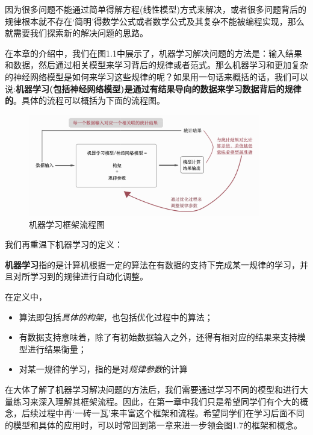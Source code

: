 \documentclass[12pt]{article}
\numberwithin{figure}{section}
\newenvironment{fullmodel}{
			\smallskip\noindent
			\begin{minipage}{\textwidth+\marginparwidth+\marginparsep}\smallskip\smallskip}
			{\smallskip\smallskip\end{minipage}\vspace{.1in}
			}
\numberwithin{equation}{section}
\begin{document}
因为很多问题不能通过简单得解方程(线性模型)方式来解决，或者很多问题背后的规律根本就不存在`简明'得数学公式或者数学公式及其复杂不能被编程实现，那么就需要我们探索新的解决问题的思路。

在本章的介绍中，我们在图1.1中展示了，机器学习解决问题的方法是：输入结果和数据，然后通过相关模型来学习背后的规律或者范式。那么机器学习和更加复杂的神经网络模型是如何来学习这些规律的呢？如果用一句话来概括的话，我们可以说:\textbf{机器学习(包括神经网络模型)是通过有结果导向的数据来学习数据背后的规律的}。具体的流程可以概括为下面的流程图。
\begin{figure}[H]
	\centering
	\includegraphics[width=0.9\textwidth]{fig/C1C2MLMechanism}
	\caption{机器学习框架流程图}
\end{figure}

我们再重温下机器学习的定义：
\begin{remark}
\textbf{机器学习}指的是计算机根据一定的算法在有数据的支持下完成某一规律的学习，并且对所学习到的规律进行自动化调整。	
\end{remark}

在定义中，
\begin{itemize}
	\item 算法即包括\textit{具体的构架}，也包括优化过程中的算法；
	\item 有数据支持意味着，除了有初始数据输入之外，还得有相对应的结果来支持模型进行结果衡量；
	\item 对某一规律的学习，指的是对\textit{规律参数}的计算
\end{itemize}

\begin{fullmodel}
	\begin{tcolorbox}[title=冰冻三尺非一日之寒]
		在大体了解了机器学习解决问题的方法后，我们需要通过学习不同的模型和进行大量练习来深入理解其框架流程。因此，在第一章中我们只是希望同学们有个大的概念，后续过程中再`一砖一瓦'来丰富这个框架和流程。希望同学们在学习后面不同的模型和具体的应用时，可以时常回到第一章来进一步领会图1.7的框架和概念。
	\end{tcolorbox}
\end{fullmodel}
\end{document}
